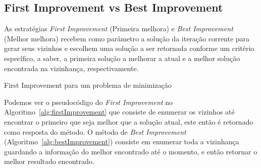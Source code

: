 % 

\subsection{First Improvement vs Best Improvement} \label{subsec:firstBestImprovement}

As estratégias \textit{First Improvement} (Primeira melhora) e \textit{Best Improvement} (Melhor melhora) recebem como parâmetro a solução da iteração corrente para gerar seus vizinhos e escolhem uma solução a ser retornada conforme um critério específico, a saber, a primeira solução a melhorar a atual e a melhor solução encontrada na vizinhança, respectivamente.

\begin{algorithm}[htpb]
\caption{First Improvement para um problema de minimização}
\label{alg:firstImprovement}
\begin{algorithmic}[1]
         
             
            \EndIf
        \EndFor
         
    \EndFunction
\end{algorithmic}
\end{algorithm}

Podemos ver o pseudocódigo do \textit{First Improvement} no Algoritmo~\ref{alg:firstImprovement} que consiste de enumerar os vizinhos até encontrar o primeiro que seja melhor que a solução atual, este então é retornado como resposta do método.
O método de \textit{Best Improvement} (Algoritmo~\ref{alg:bestImprovement}) consiste em enumerar toda a vizinhança guardando a informação do melhor encontrado até o momento, e então retornar o melhor resultado encontrado.

